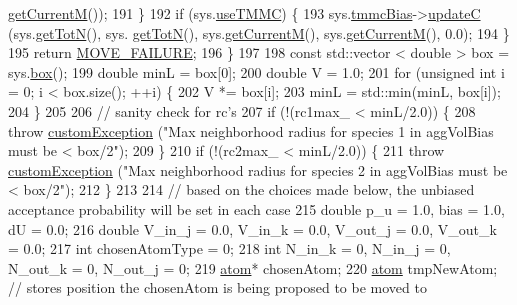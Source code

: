 \begin{DoxyCode}
      \hyperlink{classsim_system_a299fe4372e610b554eaaf5f5957b2dbc}{getCurrentM}());
191             \}
192             \textcolor{keywordflow}{if} (sys.\hyperlink{classsim_system_aa474a50b6353c8897331b1ab1ce53ab1}{useTMMC}) \{
193                     sys.\hyperlink{classsim_system_a13173f45a1e40a5f5a3552b0ebe15b54}{tmmcBias}->\hyperlink{classtmmc_ae067afc5b52af203b9d45f18d9737219}{updateC} (sys.\hyperlink{classsim_system_a37dd827f4057049763351510147b9f1d}{getTotN}(), sys.
      \hyperlink{classsim_system_a37dd827f4057049763351510147b9f1d}{getTotN}(), sys.\hyperlink{classsim_system_a299fe4372e610b554eaaf5f5957b2dbc}{getCurrentM}(), sys.\hyperlink{classsim_system_a299fe4372e610b554eaaf5f5957b2dbc}{getCurrentM}(), 0.0);
194             \}
195             \textcolor{keywordflow}{return} \hyperlink{moves_8h_a9832cf5fcfa8c0894545b591c9908e39}{MOVE\_FAILURE};
196         \}
197 
198         \textcolor{keyword}{const} std::vector < double > box = sys.\hyperlink{classsim_system_a8bff9dfb95b1b09a0fab2c1c485ade07}{box}();
199         \textcolor{keywordtype}{double} minL = box[0];
200         \textcolor{keywordtype}{double} V = 1.0;
201         \textcolor{keywordflow}{for} (\textcolor{keywordtype}{unsigned} \textcolor{keywordtype}{int} i = 0; i < box.size(); ++i) \{
202             V *= box[i];
203             minL = std::min(minL, box[i]);
204         \}
205 
206         \textcolor{comment}{// sanity check for rc's}
207         \textcolor{keywordflow}{if} (!(rc1max\_ < minL/2.0)) \{
208             \textcolor{keywordflow}{throw} \hyperlink{classcustom_exception}{customException} (\textcolor{stringliteral}{"Max neighborhood radius for species 1 in aggVolBias must
       be < box/2"});
209         \}
210         \textcolor{keywordflow}{if} (!(rc2max\_ < minL/2.0)) \{
211             \textcolor{keywordflow}{throw} \hyperlink{classcustom_exception}{customException} (\textcolor{stringliteral}{"Max neighborhood radius for species 2 in aggVolBias must
       be < box/2"});
212         \}
213 
214         \textcolor{comment}{// based on the choices made below, the unbiased acceptance probability will be set in each case}
215         \textcolor{keywordtype}{double} p\_u = 1.0, bias = 1.0, dU = 0.0;
216     \textcolor{keywordtype}{double} V\_in\_j = 0.0, V\_in\_k = 0.0, V\_out\_j = 0.0, V\_out\_k = 0.0;
217         \textcolor{keywordtype}{int} chosenAtomType = 0;
218     \textcolor{keywordtype}{int}  N\_in\_k = 0, N\_in\_j = 0, N\_out\_k = 0, N\_out\_j = 0;
219         \hyperlink{classatom}{atom}* chosenAtom;
220         \hyperlink{classatom}{atom} tmpNewAtom; \textcolor{comment}{// stores position the chosenAtom is being proposed to be moved to}

\end{DoxyCode}
